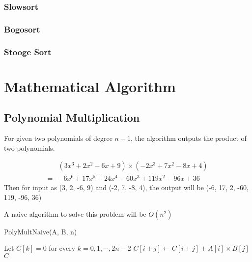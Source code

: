 			\subsection{Slowsort}

			\subsection{Bogosort}

			\subsection{Stooge Sort}

	\chapter{Mathematical Algorithm}
		\section{Polynomial Multiplication}
			For given two polynomials of degree $n - 1$, the algorithm outputs the product of two polynomials.
			\begin{example}
				\begin{align}
					&(3x^3 + 2x^2 - 6x + 9) \times (-2x^3 + 7x^2 - 8x + 4)\\
					=& -6x^6 + 17x^5 + 24x^4 -60x^3 +119x^2 -96x +36
				\end{align}
				Then for input as (3, 2, -6, 9) and (-2, 7, -8, 4), the output will be (-6, 17, 2, -60, 119, -96, 36)
			\end{example}

			A naive algorithm to solve this problem will be $O(n^2)$
			\begin{algorithm}[h]
				\caption{PolyMultNaive(A, B, n)}
				\begin{algorithmic}[1]
					\State Let $C[k] = 0$ for every $k = 0, 1, \cdots, 2n - 2$
							\State $C[i + j] \gets C[i + j] + A[i] \times B[j]$
						\EndFor
					\EndFor
					\Return $C$
				\end{algorithmic}
			\end{algorithm}

